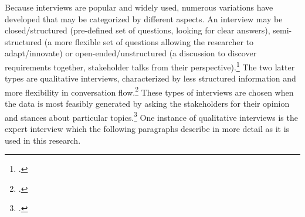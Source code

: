 Because interviews are popular and widely used, numerous variations have developed that may be categorized by different aspects. An interview may be closed/structured (pre-defined set of questions, looking for clear answers), semi-structured (a more flexible set of questions allowing the researcher to adapt/innovate) or open-ended/unstructured (a discussion to discover requirements together, stakeholder talks from their perspective).\footcites[Cf.][p.2]{TiwariMethodologySelectionRequirement2017}[cf.][p.39 et seqq]{EdwardsWhatqualitativeinterviewing2013} The two latter types are qualitative interviews, characterized by less structured information and more flexibility in conversation flow.\footcite[Cf.][p.13]{EdwardsWhatqualitativeinterviewing2013} These types of interviews are chosen when the data is most feasibly generated by asking the stakeholders for their opinion and stances about particular topics.\footcite[Cf.][p.76]{MasonQualitativeresearching2002} One instance of qualitative interviews is the expert interview which the following paragraphs describe in more detail as it is used in this research.




